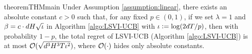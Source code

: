  



 




 
 


\begin{restatable}{theorem}{THMmain} \label{thm:main}
Under Assumption \ref{assumption:linear}, there 
exists an absolute constant $c >0$ such that, for any fixed $p \in (0, 1)$, if we set $\lambda = 1$ and  $\beta =  c \cdot d H \sqrt{\iota} $ in Algorithm \ref{algo:LSVI-UCB} with $\iota \mathrel{\mathop:}= \log (2dT/p)$,   
 then with probability $1-p$, the total regret of LSVI-UCB (Algorithm \ref{algo:LSVI-UCB}) is at most $\mathcal{O}(\sqrt{d^3 H^3 T\iota^2})$, where $\mathcal{O}(\cdot)$ hides only absolute constants. 
\end{restatable}

